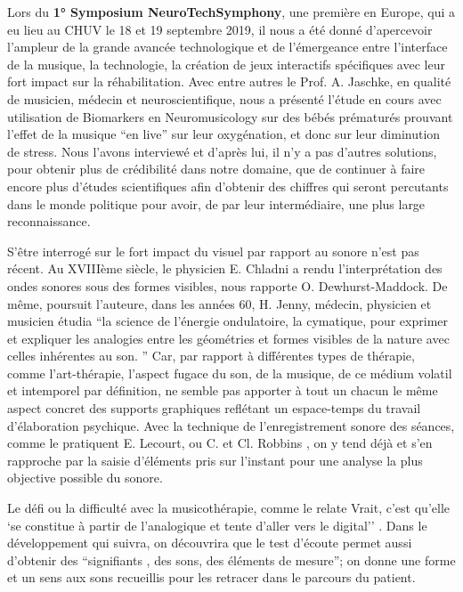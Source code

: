  Lors du \textbf{1° Symposium
 NeuroTechSymphony}, une première en Europe, qui a eu lieu au CHUV le 18 et 19 septembre 2019, il nous a été
 donné d'apercevoir l'ampleur de la grande avancée technologique
 et de l'émergeance entre l'interface de la musique, la technologie, la
 création de jeux interactifs spécifiques avec leur fort impact sur la
 réhabilitation. Avec entre autres le Prof. A. Jaschke, en qualité de musicien, médecin et 
 neuroscientifique, nous a  présenté l'étude en cours avec utilisation de
Biomarkers en Neuromusicology sur des
bébés prématurés prouvant l'effet de la musique ``en live'' sur leur
oxygénation, et donc sur leur diminution de stress. Nous l'avons interviewé et d'après lui, il n'y a pas 
d'autres solutions, pour obtenir plus de crédibilité dans notre domaine, que de continuer à faire encore 
plus d'études scientifiques afin d'obtenir des chiffres qui seront percutants dans le monde politique pour 
avoir, de par leur intermédiaire, une plus large reconnaissance.


S'être interrogé sur le fort impact du visuel par rapport au sonore n'est pas récent. Au XVIIIème siècle, le 
physicien E. Chladni a rendu l'interprétation des ondes sonores sous des formes visibles, nous 
rapporte O. Dewhurst-Maddock. De même, poursuit l'auteure, dans les années 60, H. Jenny, 
médecin, physicien et musicien étudia  ``la science de l'énergie ondulatoire, la cymatique, pour exprimer 
et expliquer les analogies entre les géométries et formes visibles de la nature avec celles inhérentes au 
son. ''\autocite [30] {Dewhurst}
Car, par rapport à différentes types de thérapie, comme l'art-thérapie,
l'aspect fugace du son, de la musique, de ce médium volatil et
intemporel par
définition, ne semble pas apporter à tout un chacun le
même aspect concret des supports
graphiques
reflétant un espace-temps du travail d'élaboration
psychique.
Avec la technique de l'enregistrement sonore des séances, comme le pratiquent E.
Lecourt, ou C. et Cl.
Robbins \autocite {lecourt_les_2017}, on y tend déjà et s'en rapproche par la saisie d'éléments pris sur l'instant pour une
analyse la plus objective possible du sonore.


 Le défi ou la difficulté avec la musicothérapie, comme le relate Vrait, 
 c'est qu'elle  `se constitue à partir 
 de l'analogique et tente d'aller vers le digital'' 
 \autocite[24]{vrait_musicotherapie_2018}.
Dans le développement qui suivra, on découvrira que le test d'écoute permet aussi d'obtenir des   
\enquote{signifiants , des sons, des éléments de mesure}; on donne
une forme et un sens aux sons recueillis pour les retracer dans le
parcours du patient.

